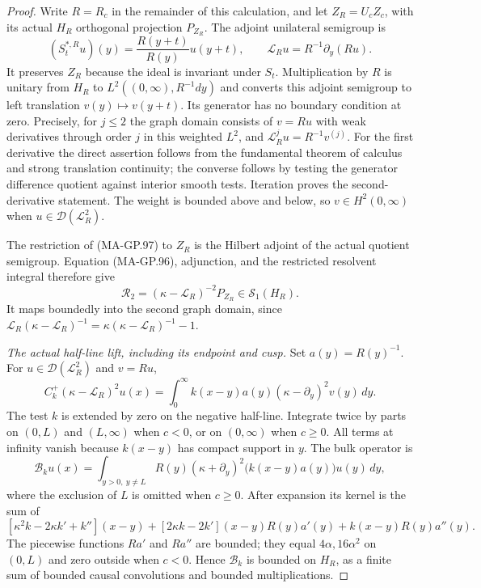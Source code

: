 \begin{proof}
Write $R=R_c$ in the remainder of this calculation, and
let $Z_R=U_cZ_c$, with its actual $H_R$ orthogonal projection
$P_{Z_R}$.  The adjoint unilateral semigroup is
\[
  (S_t^{*,R}u)(y)=\frac{R(y+t)}{R(y)}u(y+t),
       \qquad \mathcal L_Ru=R^{-1}\partial_y(Ru).
 \tag{MA-GP.97}
\]
It preserves $Z_R$ because the ideal is invariant under $S_t$.
Multiplication by $R$ is unitary from $H_R$ to
$L^2((0,\infty),R^{-1}dy)$ and converts this adjoint
semigroup to left translation $v(y)\mapsto v(y+t)$.
Its generator has no boundary condition at zero.
Precisely, for $j\le2$ the graph domain consists of
$v=Ru$ with weak derivatives through order $j$ in this
weighted $L^2$, and $\mathcal L_R^j u=R^{-1}v^{(j)}$.
For the first derivative the direct assertion follows from
the fundamental theorem of calculus and strong translation
continuity; the converse follows by testing the generator
difference quotient against interior smooth tests.
Iteration proves the second-derivative statement.
The weight is bounded above and below, so $v\in H^2(0,\infty)$
when $u\in\mathcal D(\mathcal L_R^2)$.

The restriction of (MA-GP.97) to $Z_R$ is the Hilbert
adjoint of the actual quotient semigroup.  Equation
(MA-GP.96), adjunction, and the restricted resolvent integral
therefore give
\[
 \mathcal R_2=(\kappa-\mathcal L_R)^{-2}P_{Z_R}
                       \in\mathcal S_1(H_R).
 \tag{MA-GP.98}
\]
It maps boundedly into the second graph domain, since
$\mathcal L_R(\kappa-\mathcal L_R)^{-1}
=\kappa(\kappa-\mathcal L_R)^{-1}-1$.

\emph{The actual half-line lift, including its endpoint and cusp.}
Set $a(y)=R(y)^{-1}$.  For
$u\in\mathcal D(\mathcal L_R^2)$ and $v=Ru$,
\[
 C_k^+(\kappa-\mathcal L_R)^2u(x)
       =\int_0^\infty k(x-y)a(y)
                             (\kappa-\partial_y)^2v(y)\,dy .
 \tag{MA-GP.99}
\]
The test $k$ is extended by zero on the negative half-line.
Integrate twice by parts on $(0,L)$ and $(L,\infty)$
when $c<0$, or on $(0,\infty)$ when $c\ge0$.
All terms at infinity vanish because $k(x-y)$ has compact
support in $y$.  The bulk operator is
\[
 \mathcal B_k u(x)=
   \int_{y>0,\ y\ne L} R(y)
       (\kappa+\partial_y)^2
                 \bigl(k(x-y)a(y)\bigr)u(y)\,dy ,
 \tag{MA-GP.100}
\]
where the exclusion of $L$ is omitted when $c\ge0$.
After expansion its kernel is the sum of
\[
  [\kappa^2k-2\kappa k'+k''](x-y)
 +[2\kappa k-2k'](x-y)R(y)a'(y)
 +k(x-y)R(y)a''(y).
 \tag{MA-GP.101}
\]
The piecewise functions $Ra'$ and $Ra''$ are bounded;
they equal $4\alpha,16\alpha^2$ on $(0,L)$ and zero
outside when $c<0$.  Hence $\mathcal B_k$ is bounded
on $H_R$, as a finite sum of bounded causal convolutions
and bounded multiplications.


\end{proof}
